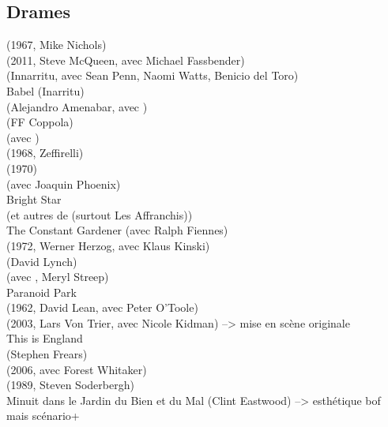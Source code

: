 \subsection{Drames}
(1967, Mike Nichols) \beau \beau \\
 (2011, Steve McQueen, avec Michael Fassbender) \beau \beau \\
 (Innarritu, avec Sean Penn, Naomi Watts, Benicio del Toro) \\
Babel (Inarritu) \\
 (Alejandro Amenabar, avec \JavierBardem) \\
 (FF Coppola) \beau \\
 (avec \JohnMalkovich) \beau \\
 (1968, Zeffirelli) \\
 (1970) \beau \beau \\
 (avec Joaquin Phoenix) \beau \\
Bright Star \beau  \\
 (et autres de \MartinScorsese (surtout Les Affranchis)) \\
The Constant Gardener (avec Ralph Fiennes) \\
 (1972, Werner Herzog, avec Klaus Kinski) \\
 (David Lynch)\\
(avec \DustinHoffman, Meryl Streep) \\
Paranoid Park \\
 (1962, David Lean, avec Peter O'Toole) \\
  (2003, Lars Von Trier, avec Nicole Kidman) --> mise en scène originale\\
This is England \\
 (Stephen Frears) \beau \\
 (2006, avec Forest Whitaker)\\
 (1989, Steven Soderbergh)\\
Minuit dans le Jardin du Bien et du Mal (Clint Eastwood) --> esthétique bof mais scénario+ \\ \\

